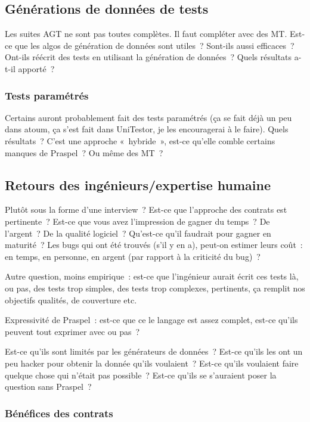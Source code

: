 \subsection{Générations de données de tests}

Les suites AGT ne sont pas toutes complètes. Il faut compléter avec des MT.
Est-ce que les algos de génération de données sont utiles~? Sont-ils aussi
efficaces~? Ont-ils réécrit des tests en utilisant la génération de données~?
Quels résultats a-t-il apporté~?

\subsubsection{Tests paramétrés}

Certains auront probablement fait des tests paramétrés (ça se fait déjà un peu
dans atoum, ça s'est fait dans UniTestor, je les encouragerai à le faire). Quels
résultats~? C'est une approche «~hybride~», est-ce qu'elle comble certains
manques de Praspel~? Ou même des MT~?

\subsection{Retours des ingénieurs/expertise humaine}

Plutôt sous la forme d'une interview~? Est-ce que l'approche des contrats est
pertinente~? Est-ce que vous avez l'impression de gagner du temps~? De
l'argent~? De la qualité logiciel~? Qu'est-ce qu'il faudrait pour gagner en
maturité~? Les bugs qui ont été trouvés (s'il y en a), peut-on estimer leurs
coût~: en temps, en personne, en argent (par rapport à la criticité du bug)~?

Autre question, moins empirique~: est-ce que l'ingénieur aurait écrit ces tests
là, ou pas, des tests trop simples, des tests trop complexes, pertinents, ça
remplit nos objectifs qualités, de couverture etc.

Expressivité de Praspel~: est-ce que ce le langage est assez complet, est-ce
qu'ils peuvent tout exprimer avec ou pas~?

Est-ce qu'ils sont limités par les générateurs de données~? Est-ce qu'ils les
ont un peu hacker pour obtenir la donnée qu'ils voulaient~? Est-ce qu'ils
voulaient faire quelque chose qui n'était pas possible~? Est-ce qu'ils se
s'auraient poser la question sans Praspel~?

\subsubsection{Bénéfices des contrats}

